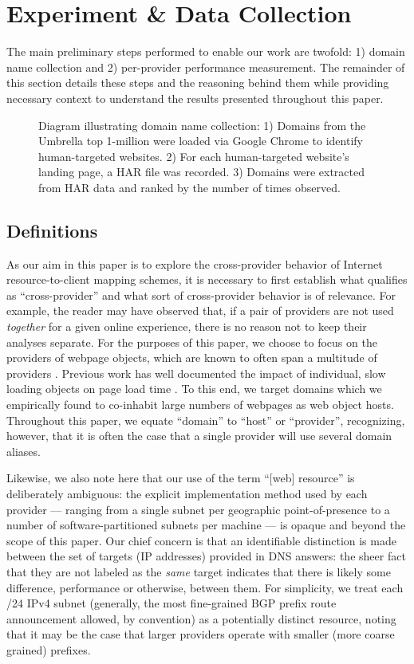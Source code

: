 \section{Experiment \& Data Collection} \label{oversky}

The main preliminary steps performed to enable our
work are twofold: 1) domain name collection and 2) per-provider performance
measurement. The
remainder of this section details these steps and the reasoning behind them
while providing necessary context to understand the results presented throughout this paper. 

\begin{figure}
    \caption{Diagram illustrating domain name collection: 1) Domains from the Umbrella top 1-million were loaded via Google Chrome to identify human-targeted websites. 2) For each human-targeted website's landing page, a HAR file was recorded. 3) Domains were extracted from HAR data and ranked by the number of times observed.
    }
    \label{fig:domfind}
\end{figure}

\subsection{Definitions}

As our aim in this paper is to explore the cross-provider behavior of Internet
resource-to-client mapping schemes, it is necessary to first establish what
qualifies as ``cross-provider'' and what sort of cross-provider behavior is of
relevance. For example, the reader may have observed that, if a pair of
providers are not used \emph{together} for a given online experience, there
is no reason not to keep their analyses separate. For the purposes of this
paper, we choose to focus on the providers of webpage objects, which are known
to often span a multitude of providers \cite{butkiewicz2011}. Previous work has well documented
the impact of individual, slow loading objects on page load time \cite{wang2013}. To this
end, we target domains which we empirically found to co-inhabit large numbers of
webpages as web object hosts. Throughout this paper, we equate ``domain'' to
``host'' or ``provider'', recognizing, however, that it is often the case that a
single provider will use several domain aliases. 

Likewise, we also note here that our use of the term ``[web] resource'' is
deliberately ambiguous: the explicit implementation method used by each provider
--- ranging from a single subnet per geographic point-of-presence to a number of
software-partitioned subnets per machine --- is opaque and beyond the scope of
this paper. Our chief concern is that an identifiable distinction is made
between the set of targets (IP addresses) provided in DNS answers: the sheer fact that they are not
labeled as the \emph{same} target indicates that there is likely some difference,
performance or otherwise, between them. For simplicity, we treat
each /24 IPv4 subnet (generally, the most fine-grained BGP prefix route
announcement allowed, by convention) as a potentially distinct resource, noting
that it may be the case that larger providers operate with smaller (more coarse
grained) prefixes.

